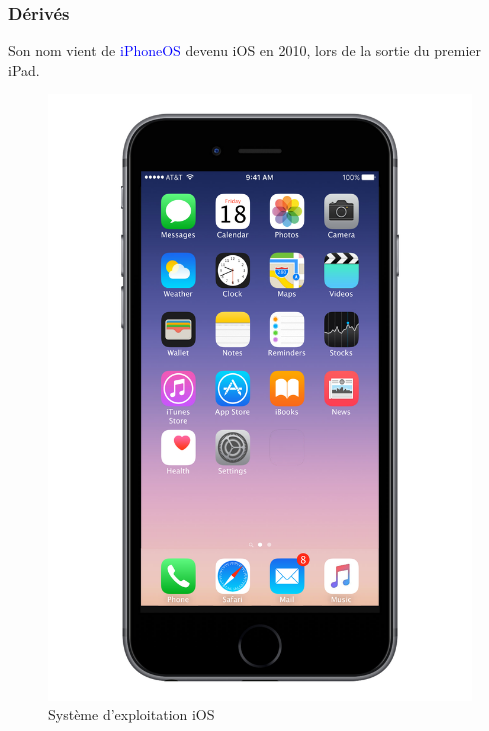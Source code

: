 \documentclass[aspectratio=169]{beamer}
\begin{document}
\begin{frame}
  \frametitle{Dérivés}
  Son nom vient de \textcolor{blue}{iPhoneOS} devenu iOS en 2010, lors de la
  sortie du premier iPad.
  \begin{figure}[!h]
    \center
    \includegraphics[scale=0.08]
    {textures/images/mac/historic/iOS.pdf}
    \caption{Système d'exploitation iOS}
  \end{figure}
\end{frame}
\end{document}
